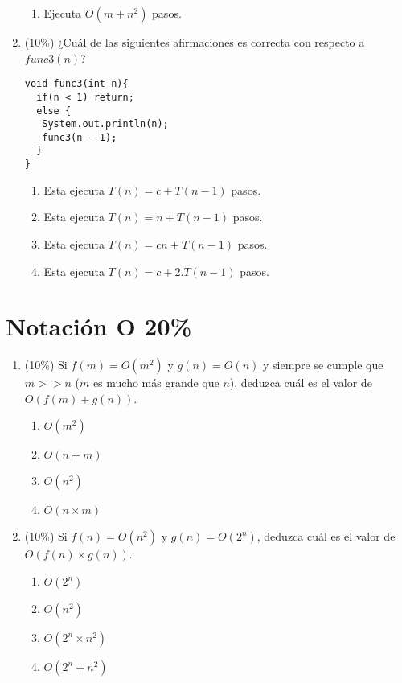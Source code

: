 \documentclass[10 pt]{article}
\begin{document}
\begin{multicols}{2}
\begin{enumerate}[label=\alph*]
\begin{enumerate}[label=\roman*]
\item Ejecuta $O(m + n^2)$ pasos.
\end{enumerate}
\item (10\%) ¿Cuál de las siguientes afirmaciones es correcta con respecto a $func3(n)$?
\begin{lstlisting}
void func3(int n){
  if(n < 1) return;
  else {
   System.out.println(n);
   func3(n - 1);
  }
}
\end{lstlisting}
\begin{enumerate}[label=\roman*]
\item Esta ejecuta $T(n) = c + T(n-1)$ pasos.
\item Esta ejecuta $T(n) = n + T(n-1)$ pasos.
\item Esta ejecuta $T(n) = c n + T(n-1)$ pasos.
\item Esta ejecuta $T(n) = c + 2.T(n-1)$ pasos.
\end{enumerate}
\end{enumerate}
\section{Notación O 20\%}
\begin{enumerate}[label=\alph*]
\item (10\%) Si $f(m) = O(m^2)$ y $g(n) = O(n)$ y siempre se cumple que $m >> n$ ($m$ es mucho más grande que $n$), deduzca cuál es el valor de $O(f(m) + g(n))$.
\begin{enumerate}[label=(\roman*)]
\item $O(m^2)$
\item $O(n + m)$
\item $O(n ^ 2)$
\item $O(n \times m)$
\end{enumerate}
\item (10\%) Si $f(n) = O(n^2)$ y $g(n) = O(2^n)$, deduzca cuál es el valor de $O(f(n) \times g(n))$.
\begin{enumerate}[label=(\roman*)]
\item $O(2^n)$
\item $O(n^2)$
\item $O(2^n \times n^2)$
\item $O(2^n + n^2)$
\end{enumerate}
\end{enumerate}

\end{multicols}
\end{document}
